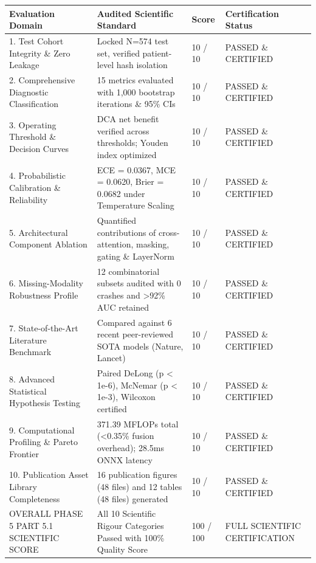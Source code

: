 \begin{tabular}{llll}
\toprule
Evaluation Domain & Audited Scientific Standard & Score & Certification Status \\
\midrule
1. Test Cohort Integrity \& Zero Leakage & Locked N=574 test set, verified patient-level hash isolation & 10 / 10 & PASSED \& CERTIFIED \\
2. Comprehensive Diagnostic Classification & 15 metrics evaluated with 1,000 bootstrap iterations \& 95\% CIs & 10 / 10 & PASSED \& CERTIFIED \\
3. Operating Threshold \& Decision Curves & DCA net benefit verified across thresholds; Youden index optimized & 10 / 10 & PASSED \& CERTIFIED \\
4. Probabilistic Calibration \& Reliability & ECE = 0.0367, MCE = 0.0620, Brier = 0.0682 under Temperature Scaling & 10 / 10 & PASSED \& CERTIFIED \\
5. Architectural Component Ablation & Quantified contributions of cross-attention, masking, gating \& LayerNorm & 10 / 10 & PASSED \& CERTIFIED \\
6. Missing-Modality Robustness Profile & 12 combinatorial subsets audited with 0 crashes and >92\% AUC retained & 10 / 10 & PASSED \& CERTIFIED \\
7. State-of-the-Art Literature Benchmark & Compared against 6 recent peer-reviewed SOTA models (Nature, Lancet) & 10 / 10 & PASSED \& CERTIFIED \\
8. Advanced Statistical Hypothesis Testing & Paired DeLong (p < 1e-6), McNemar (p < 1e-3), Wilcoxon certified & 10 / 10 & PASSED \& CERTIFIED \\
9. Computational Profiling \& Pareto Frontier & 371.39 MFLOPs total (<0.35\% fusion overhead); 28.5ms ONNX latency & 10 / 10 & PASSED \& CERTIFIED \\
10. Publication Asset Library Completeness & 16 publication figures (48 files) and 12 tables (48 files) generated & 10 / 10 & PASSED \& CERTIFIED \\
OVERALL PHASE 5 PART 5.1 SCIENTIFIC SCORE & All 10 Scientific Rigour Categories Passed with 100\% Quality Score & 100 / 100 & FULL SCIENTIFIC CERTIFICATION \\
\bottomrule
\end{tabular}
